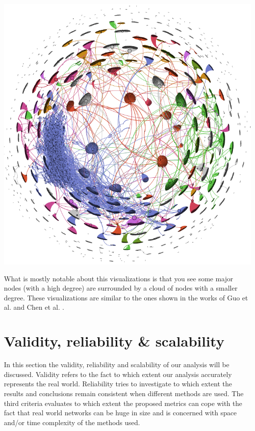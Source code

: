 \documentclass[10pt,a4paper]{article}
\newenvironment{Figure}
  {\par\medskip\noindent\minipage{\linewidth}}
  {\endminipage\par\medskip}
\begin{document}
\begin{multicols}{2}
\begin{Figure}
\centering
\label{fig:my_label}
\includegraphics[scale=0.37]{figures/Marc21_edges.png}
\label{clusters}
\end{Figure}

What is mostly notable about this visualizations is that you see some major nodes (with a high degree) are surrounded by a cloud of nodes with a smaller degree. These visualizations are similar to the ones shown in the works of Guo et al. \cite{GUO201958} and Chen et al. \cite{chenEthereum}.

\section{Validity, reliability \& scalability}

In this section the validity, reliability and scalability of our analysis will be discussed. Validity refers to the fact to which extent our analysis accurately represents the real world. Reliability tries to investigate to which extent the results and conclusions remain consistent when different methods are used. The third criteria evaluates to which extent the proposed metrics can cope with the fact that real world networks can be huge in size and is concerned with space and/or time complexity of the methods used. 


\end{multicols}
\end{document}
